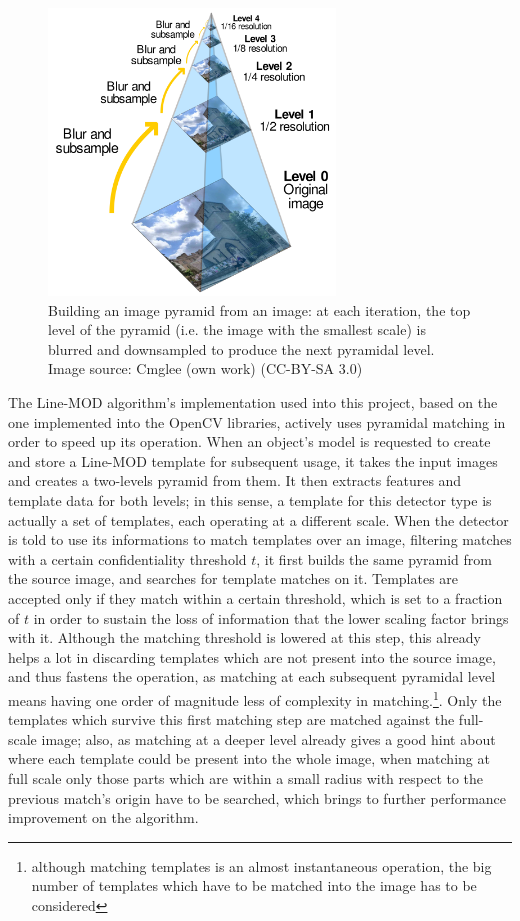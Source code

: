 \begin{figure}[htbp]
\centering
\includegraphics[width=3in]{./Graphics/pyramidal-images}
\caption{Building an image pyramid from an image: at each iteration,
  the top level of the pyramid (i.e. the image with the smallest
  scale) is blurred and downsampled to produce the next pyramidal
  level. Image source: Cmglee (own work) (CC-BY-SA 3.0)
  \label{fig:pyramidal-images}}
\end{figure}

The Line-MOD algorithm's implementation used into this project, based
on the one implemented into the OpenCV libraries, actively uses
pyramidal matching in order to speed up its operation. When an
object's model is requested to create and store a Line-MOD template
for subsequent usage, it takes the input images and creates a
two-levels pyramid from them. It then extracts features and template
data for both levels; in this sense, a template for this detector type
is actually a set of templates, each operating at a different
scale. When the detector is told to use its informations to
match templates over an image, filtering matches with a certain
confidentiality threshold $t$, it first builds the same pyramid from
the source image, and searches for template matches on it. Templates
are accepted only if they match within a certain threshold, which is
set to a fraction of $t$ in order to sustain the loss of information
that the lower scaling factor brings with it. Although the matching
threshold is lowered at this step, this already helps a lot in
discarding templates which are not present into the source image, and
thus fastens the operation, as matching at each subsequent pyramidal
level means having one order of magnitude less of complexity in
matching.\footnote{although matching templates is an almost
  instantaneous operation, the big number of templates which have to
  be matched into the image has to be considered}. Only the templates
which survive this first matching step are matched against the
full-scale image; also, as matching at a deeper level already gives a
good hint about where each template could be present into the whole
image, when matching at full scale only those parts which are within a
small radius with respect to the previous match's origin have to  be
searched, which brings to further performance improvement on the algorithm.

